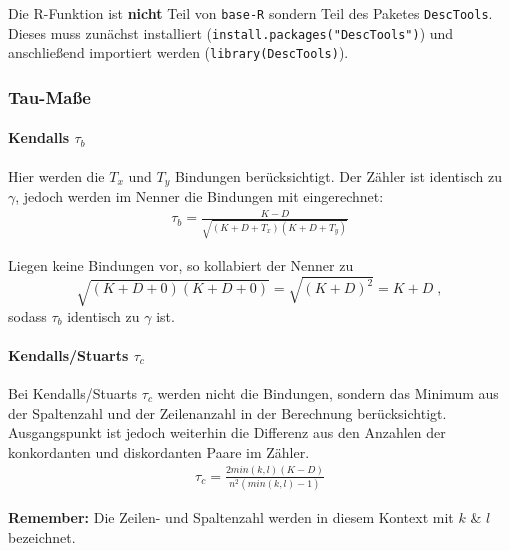 \documentclass[a4paper]{article}
\newcommand\dangersign[1][2ex]{%
  \renewcommand\stacktype{L}%
  \scaleto{\stackon[1.3pt]{\color{red}$\triangle$}{\tiny !}}{#1}%
}
\begin{document}
\noindent \dangersign[3ex] Die R-Funktion ist \textbf{nicht} Teil von \texttt{base-R} sondern Teil des Paketes \texttt{DescTools}. Dieses muss zunächst installiert (\texttt{install.packages("DescTools")}) und anschließend importiert werden (\texttt{library(DescTools)}).

\clearpage

\subsubsection{Tau-Maße}\label{sec:tau}

\paragraph{Kendalls $\tau_b$}
Hier werden die $T_x$ und $T_y$ Bindungen berücksichtigt. Der Zähler ist identisch zu $\gamma$, jedoch werden im Nenner die Bindungen mit eingerechnet:
\begin{align*}
    \tau_b = \frac{K-D}{\sqrt{(K+D+T_x)(K+D+T_y)}}
\end{align*}

\noindent \dangersign[3ex] Liegen keine Bindungen vor, so kollabiert der Nenner zu 
$$\sqrt{(K+D+0)(K+D+0)} = \sqrt{(K+D)^2} = K+D\;,$$ sodass $\tau_b$ identisch zu $\gamma$ ist.\\

\noindent  {}

\paragraph{Kendalls/Stuarts $\tau_c$}
Bei Kendalls/Stuarts $\tau_c$ werden nicht die Bindungen, sondern das Minimum aus der Spaltenzahl und der Zeilenanzahl in der Berechnung berücksichtigt. Ausgangspunkt ist jedoch weiterhin die Differenz aus den Anzahlen der konkordanten und diskordanten Paare im Zähler.
\begin{align*}
    \tau_c = \frac{2min(k,l) (K-D)}{n^2(min(k,l)-1)}
\end{align*}

\noindent \dangersign[3ex] \textbf{Remember:} Die Zeilen- und Spaltenzahl werden in diesem Kontext mit $k$ \& $l$ bezeichnet.\\

\noindent  {}
\end{document}
